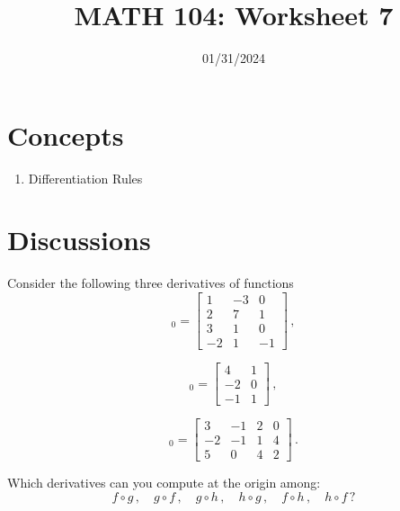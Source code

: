 \documentclass[12pt]{amsart}
\title{ MATH 104: Worksheet 7}
\author{}
\date{01/31/2024}
\begin{document}
\maketitle

\section{Concepts}

\begin{enumerate}
    \item Differentiation Rules 
\end{enumerate}

\section{Discussions}

\begin{question}
    Consider the following three derivatives of functions
    \begin{equation*}
        [Df]_0 = 
        \begin{bmatrix}
            1 & -3 & 0 \\
            2 & 7 & 1 \\
            3 & 1 & 0 \\
            -2 & 1 & -1 
        \end{bmatrix}\,,
    \end{equation*}

    \begin{equation*}
        [Dg]_0 = 
        \begin{bmatrix}
            4 & 1 \\
            -2 & 0 \\
            -1 & 1
        \end{bmatrix} \,,
    \end{equation*}

    \begin{equation*}
        [Dh]_0 =
        \begin{bmatrix}
            3 & -1 & 2 & 0 \\
            -2 & -1 & 1 & 4 \\
            5 & 0 & 4 & 2
        \end{bmatrix} \,.
    \end{equation*}

    Which derivatives can you compute at the origin among:
    \begin{equation*}
        f\circ g \,, \quad g\circ f \,, \quad g \circ h \,, \quad h \circ g \,, \quad f \circ h \,, \quad h \circ f \,?
    \end{equation*}
\end{question}
\end{document}
